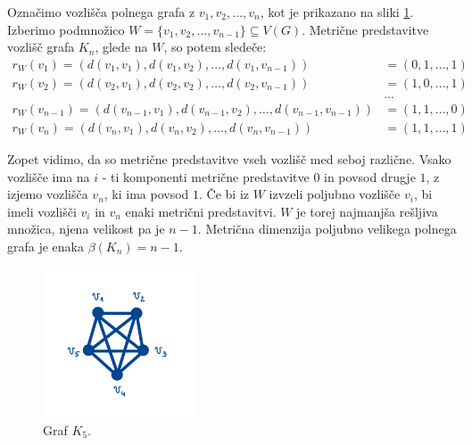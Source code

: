 \documentclass[mat1, tisk]{fmfdelo}
\newcommand{\1}{(1, 1, \ldots, 1)}
\newcommand{\2}{(2, 2, \ldots, 2)}
\begin{document}
\begin{primer}\label{pr:mdim_poln}
    Označimo vozlišča polnega grafa z $v_1, v_2, \ldots, v_n$, kot je prikazano na sliki \ref{fig:polni}. 
    Izberimo podmnožico $W = \{ v_1, v_2, \ldots , v_{n-1} \} \subseteq V(G).$ 
    Metrične predstavitve vozlišč grafa $K_n$, glede na $W$, so potem sledeče:
    \begin{align*}
        r_W(v_1) = (d(v_1, v_1), d(v_1, v_2), \ldots , d(v_1, v_{n-1})) & = (0, 1, \ldots , 1) \\
        r_W(v_2) = (d(v_2, v_1), d(v_2, v_2), \ldots , d(v_2, v_{n-1})) & = (1, 0, \ldots , 1) \\
        & \dots \\
        r_W(v_{n-1}) = (d(v_{n-1}, v_1), d(v_{n-1}, v_2), \ldots , d(v_{n-1}, v_{n-1})) & = (1, 1, \ldots , 0) \\
        r_W(v_n) = (d(v_n, v_1), d(v_n, v_2), \ldots ,  d(v_n, v_{n-1})) & = (1, 1, \ldots , 1)
    \end{align*}
    
    Zopet vidimo, da so metrične predstavitve vseh vozlišč med seboj različne. Vsako 
    vozlišče ima na $i$ - ti komponenti metrične predstavitve $0$ in povsod drugje $1$, 
    z izjemo vozlišča $v_n$, ki ima povsod $1$. Če bi iz $W$ izvzeli poljubno vozlišče $v_i$, 
    bi imeli vozlišči $v_i$ in $v_n$ enaki metrični predstavitvi. $W$  je torej najmanjša rešljiva množica, 
    njena velikost pa je $n-1$. Metrična dimenzija poljubno velikega polnega grafa je enaka 
    $\beta(K_n) = n-1.$

    \begin{figure}[h]
        \centering
        \includegraphics[width=0.4\textwidth]{IMG_polni.jpg}
        \caption{Graf $K_5$.}
        \label{fig:polni}
    \end{figure}

\end{primer}

\end{document}
